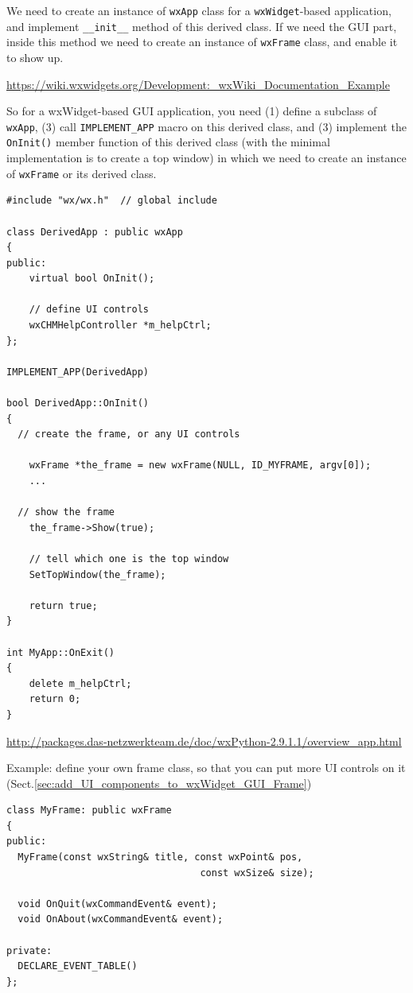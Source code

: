 We need to create an instance of \verb!wxApp! class for a \verb!wxWidget!-based application, 
and implement \verb!__init__! method of this derived class.
If we need the GUI part, inside this method we need to create an instance of
\verb!wxFrame! class, and enable it to show up.

\url{https://wiki.wxwidgets.org/Development:_wxWiki_Documentation_Example}

So for a wxWidget-based GUI application, you need (1) define a subclass of
\verb!wxApp!, (3) call \verb!IMPLEMENT_APP! macro on this derived class, and (3)
implement the \verb!OnInit()! member function of this derived class (with the
minimal implementation is to create a top window) in which we need to create an instance of
\verb!wxFrame! or its derived class.

\begin{verbatim}
#include "wx/wx.h"  // global include

class DerivedApp : public wxApp
{
public:
    virtual bool OnInit();
    
    // define UI controls
    wxCHMHelpController *m_helpCtrl;
};

IMPLEMENT_APP(DerivedApp)

bool DerivedApp::OnInit()
{
  // create the frame, or any UI controls
  
    wxFrame *the_frame = new wxFrame(NULL, ID_MYFRAME, argv[0]);
    ...
    
  // show the frame
    the_frame->Show(true);
    
    // tell which one is the top window
    SetTopWindow(the_frame);

    return true;
}

int MyApp::OnExit()
{
    delete m_helpCtrl;
    return 0;
}
\end{verbatim}
\url{http://packages.das-netzwerkteam.de/doc/wxPython-2.9.1.1/overview_app.html}

Example: define your own frame class, so that you can put more UI controls on it
(Sect.\ref{sec:add_UI_components_to_wxWidget_GUI_Frame})
\begin{verbatim}
class MyFrame: public wxFrame
{
public:
  MyFrame(const wxString& title, const wxPoint& pos, 
                                  const wxSize& size);

  void OnQuit(wxCommandEvent& event);
  void OnAbout(wxCommandEvent& event);

private:
  DECLARE_EVENT_TABLE()
};


\end{verbatim}

